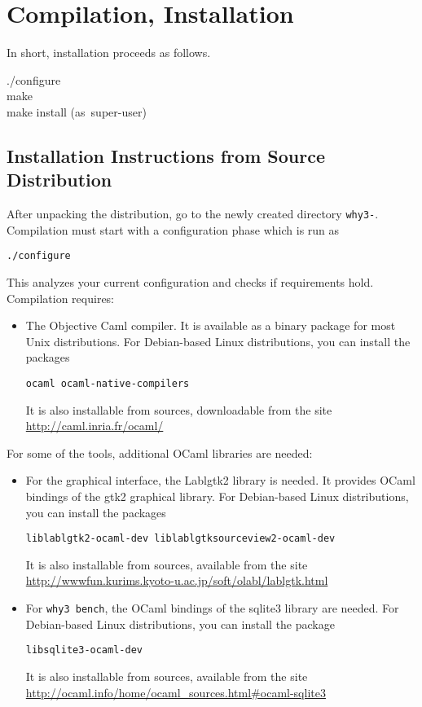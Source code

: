
\chapter{Compilation, Installation}
\label{sec:install}

In short, installation proceeds as follows.
\begin{flushleft}\ttfamily
  ./configure\\
  make\\
  make install \mbox{\rmfamily (as super-user)}
\end{flushleft}

\section{Installation Instructions from Source Distribution}

After unpacking the distribution, go to the newly created directory
\texttt{why3-\whyversion}. Compilation must start with a
configuration phase which is run as
\begin{verbatim}
./configure
\end{verbatim}
This analyzes your current configuration and checks if requirements hold.
Compilation requires:
\begin{itemize}
\item The Objective Caml compiler. It is
  available as a binary package for most Unix distributions. For
  Debian-based Linux distributions, you can install the packages
\begin{verbatim}
ocaml ocaml-native-compilers
\end{verbatim}
It is also installable from sources, downloadable from the site
\url{http://caml.inria.fr/ocaml/}
\end{itemize}

\noindent
For some of the \why tools, additional OCaml libraries are needed:
\begin{itemize}
\item For the graphical interface, the Lablgtk2 library is needed.
  It provides OCaml
  bindings of the gtk2 graphical library. For Debian-based Linux
  distributions, you can install the packages
\begin{verbatim}
liblablgtk2-ocaml-dev liblablgtksourceview2-ocaml-dev
\end{verbatim}
It is also installable from sources, available from the site
\url{http://wwwfun.kurims.kyoto-u.ac.jp/soft/olabl/lablgtk.html}

\item For \texttt{why3 bench}, the OCaml bindings of the sqlite3 library
are needed.
For Debian-based Linux distributions, you can install the package
\begin{verbatim}
libsqlite3-ocaml-dev
\end{verbatim}
It is also installable from sources, available from the site
\url{http://ocaml.info/home/ocaml_sources.html#ocaml-sqlite3}
\end{itemize}


